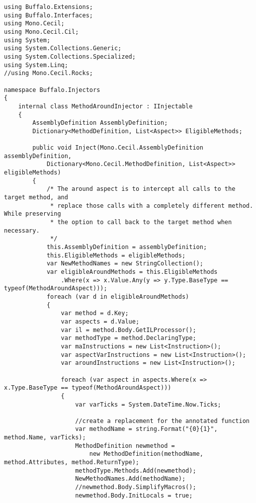 \begin{lstlisting}[caption={../buffalo/Injectors/MethodAroundInjector.cs}, label=../buffalo/Injectors/MethodAroundInjector.cs, frame=tb, basicstyle=\scriptsize]﻿using Buffalo.Extensions;
using Buffalo.Interfaces;
using Mono.Cecil;
using Mono.Cecil.Cil;
using System;
using System.Collections.Generic;
using System.Collections.Specialized;
using System.Linq;
//using Mono.Cecil.Rocks;

namespace Buffalo.Injectors
{
    internal class MethodAroundInjector : IInjectable
    {
        AssemblyDefinition AssemblyDefinition;
        Dictionary<MethodDefinition, List<Aspect>> EligibleMethods;

        public void Inject(Mono.Cecil.AssemblyDefinition assemblyDefinition, 
            Dictionary<Mono.Cecil.MethodDefinition, List<Aspect>> eligibleMethods)
        {
            /* The around aspect is to intercept all calls to the target method, and
             * replace those calls with a completely different method. While preserving
             * the option to call back to the target method when necessary.
             */
            this.AssemblyDefinition = assemblyDefinition;
            this.EligibleMethods = eligibleMethods;
            var NewMethodNames = new StringCollection();
            var eligibleAroundMethods = this.EligibleMethods
                .Where(x => x.Value.Any(y => y.Type.BaseType == typeof(MethodAroundAspect)));
            foreach (var d in eligibleAroundMethods)
            {
                var method = d.Key;
                var aspects = d.Value;
                var il = method.Body.GetILProcessor();
                var methodType = method.DeclaringType;
                var maInstructions = new List<Instruction>();
                var aspectVarInstructions = new List<Instruction>();
                var aroundInstructions = new List<Instruction>();

                foreach (var aspect in aspects.Where(x => x.Type.BaseType == typeof(MethodAroundAspect)))
                {
                    var varTicks = System.DateTime.Now.Ticks;

                    //create a replacement for the annotated function
                    var methodName = string.Format("{0}{1}", method.Name, varTicks);
                    MethodDefinition newmethod =
                        new MethodDefinition(methodName, method.Attributes, method.ReturnType);
                    methodType.Methods.Add(newmethod);
                    NewMethodNames.Add(methodName);
                    //newmethod.Body.SimplifyMacros();
                    newmethod.Body.InitLocals = true;


\end{lstlisting}
